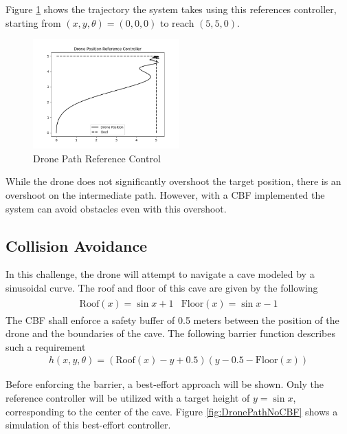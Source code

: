 \noindent Figure \ref{fig:dronepd} shows the trajectory the system takes using this references controller, starting from $(x, y, \theta) = (0, 0, 0)$ to reach $(5, 5, 0)$.

\begin{figure}[H]
    \centering
    \includegraphics[width=0.5\textwidth]{Figures/Examples/Drone/DronePD.png}
    \caption{Drone Path Reference Control}
    \label{fig:dronepd}
\end{figure}

\noindent While the drone does not significantly overshoot the target position, there is an overshoot on the intermediate path. However, with a CBF implemented the system can avoid obstacles even with this overshoot. 

\subsection{Collision Avoidance}

\noindent In this challenge, the drone will attempt to navigate a cave modeled by a sinusoidal curve. The roof and floor of this cave are given by the following 
\begin{align}
    \begin{split}
        \text{Roof}(x) = \sin{x} + 1
    \end{split}
    \begin{split}
        \text{Floor}(x) = \sin{x} - 1
    \end{split}
\end{align}
\noindent The CBF shall enforce a safety buffer of 0.5 meters between the position of the drone and the boundaries of the cave. The following barrier function describes such a requirement
\begin{align}
    h(x, y, \theta) = (\text{Roof}(x) - y + 0.5)(y - 0.5 - \text{Floor}(x))
\end{align}
 
 Before enforcing the barrier, a best-effort approach will be shown. Only the reference controller will be utilized with a target height of $y = \sin{x}$, corresponding  to the center of the cave. Figure \ref{fig:DronePathNoCBF} shows a simulation of this best-effort controller. 

